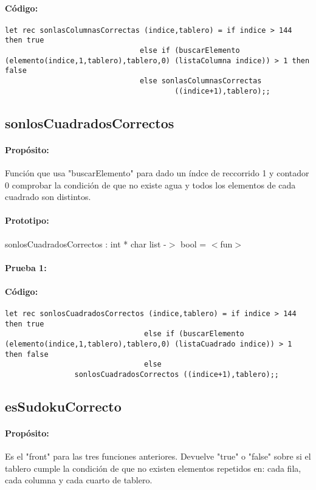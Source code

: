 \paragraph{Código:}
\begin{verbatim}
let rec sonlasColumnasCorrectas (indice,tablero) = if indice > 144 then true
					           else if (buscarElemento
(elemento(indice,1,tablero),tablero,0) (listaColumna indice)) > 1 then false 
					           else sonlasColumnasCorrectas
                                       ((indice+1),tablero);;
\end{verbatim}

\subsection{sonlosCuadradosCorrectos}

\paragraph{Propósito:} Función que usa "buscarElemento" para dado un índce de reccorrido 1 y
contador 0 comprobar la condición de que no existe agua y todos los elementos de
cada cuadrado son distintos. 
\paragraph{Prototipo:} sonlosCuadradosCorrectos : int * char list -$>$ bool = $<$fun$>$
\paragraph{Prueba 1:}
\paragraph{Código:}
\begin{verbatim}
let rec sonlosCuadradosCorrectos (indice,tablero) = if indice > 144 then true
					            else if (buscarElemento
(elemento(indice,1,tablero),tablero,0) (listaCuadrado indice)) > 1 then false 
					            else
				sonlosCuadradosCorrectos ((indice+1),tablero);;
\end{verbatim}

\subsection{esSudokuCorrecto}

\paragraph{Propósito:}Es el "front" para las tres funciones anteriores. Devuelve "true" o
"false" sobre si el tablero cumple la condición de que no existen elementos
repetidos en: cada fila, cada columna y cada cuarto de tablero. 
